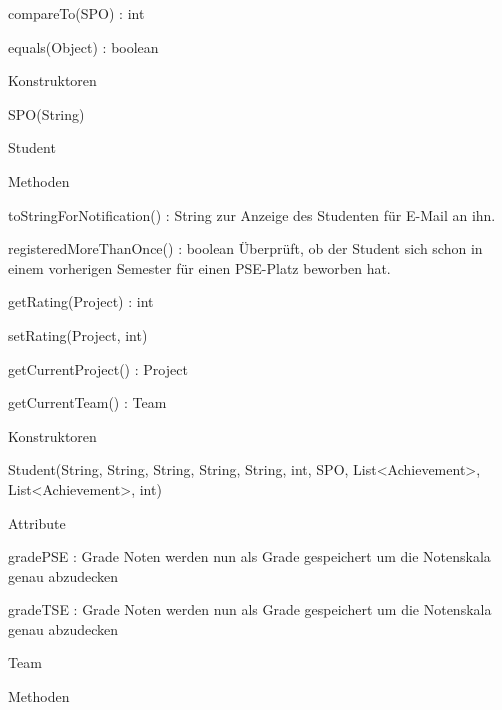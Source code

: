 \documentclass[parskip=full]{scrartcl}
\newcommand{\changeDescription}[1]{{\newline\color{black}\normalfont #1}}
\newcommand{\code}[1]{{\ttfamily #1}}
\begin{document}
\begin{itemPackage}
\begin{itemClass}
\begin{itemClassSub}
\begin{itemPlus}
\item compareTo(SPO) : int
\item equals(Object) : boolean
\end{itemPlus}
\item Konstruktoren
\begin{itemPlus}
\item SPO(String)
\end{itemPlus}
\end{itemClassSub}
\item Student
\begin{itemClassSub}
\item Methoden
\begin{itemPlus}
\item toStringForNotification() : String \changeDescription{\code{toString()}
zur Anzeige des Studenten für E-Mail an ihn.}
\item registeredMoreThanOnce() : boolean \changeDescription{Überprüft, ob der
Student sich schon in einem vorherigen Semester für einen PSE-Platz beworben
hat.}
\end{itemPlus}
\begin{itemMinus}
\item getRating(Project) : int
\item setRating(Project, int)
\item getCurrentProject() : Project
\item getCurrentTeam() : Team
\end{itemMinus}
\item Konstruktoren
\begin{itemPlus}
\item Student(String, String, String, String, String, int, SPO,
List<Achievement>, List<Achievement>, int)
\end{itemPlus}
\item Attribute 
\begin{itemChange}
\item gradePSE : Grade \changeDescription{Noten werden nun als \code{Grade}
gespeichert um die Notenskala genau abzudecken}
\item gradeTSE : Grade \changeDescription{Noten werden nun als \code{Grade}
gespeichert um die Notenskala genau abzudecken}
\end{itemChange}
\end{itemClassSub}
\item Team
\begin{itemClassSub}
\item Methoden
\begin{itemPlus}

\end{itemPlus}
\end{itemClassSub}
\end{itemClass}
\end{itemPackage}
\end{document}
